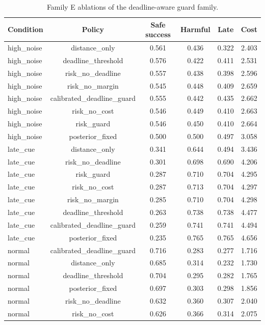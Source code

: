 \begin{table}[t]
\centering
\small
\caption{Family E ablations of the deadline-aware guard family.}
\label{tab:ablations}
\begin{tabular}{lccccc}
\toprule
Condition & Policy & Safe success & Harmful & Late & Cost \\
\midrule
high\_noise & distance\_only & 0.561 & 0.436 & 0.322 & 2.403 \\
high\_noise & deadline\_threshold & 0.576 & 0.422 & 0.411 & 2.531 \\
high\_noise & risk\_no\_deadline & 0.557 & 0.438 & 0.398 & 2.596 \\
high\_noise & risk\_no\_margin & 0.545 & 0.448 & 0.409 & 2.659 \\
high\_noise & calibrated\_deadline\_guard & 0.555 & 0.442 & 0.435 & 2.662 \\
high\_noise & risk\_no\_cost & 0.546 & 0.449 & 0.410 & 2.663 \\
high\_noise & risk\_guard & 0.546 & 0.450 & 0.410 & 2.664 \\
high\_noise & posterior\_fixed & 0.500 & 0.500 & 0.497 & 3.058 \\
late\_cue & distance\_only & 0.341 & 0.644 & 0.494 & 3.436 \\
late\_cue & risk\_no\_deadline & 0.301 & 0.698 & 0.690 & 4.206 \\
late\_cue & risk\_guard & 0.287 & 0.710 & 0.704 & 4.295 \\
late\_cue & risk\_no\_cost & 0.287 & 0.713 & 0.704 & 4.297 \\
late\_cue & risk\_no\_margin & 0.285 & 0.710 & 0.704 & 4.298 \\
late\_cue & deadline\_threshold & 0.263 & 0.738 & 0.738 & 4.477 \\
late\_cue & calibrated\_deadline\_guard & 0.259 & 0.741 & 0.741 & 4.494 \\
late\_cue & posterior\_fixed & 0.235 & 0.765 & 0.765 & 4.656 \\
normal & calibrated\_deadline\_guard & 0.716 & 0.283 & 0.277 & 1.716 \\
normal & distance\_only & 0.685 & 0.314 & 0.232 & 1.730 \\
normal & deadline\_threshold & 0.704 & 0.295 & 0.282 & 1.765 \\
normal & posterior\_fixed & 0.697 & 0.303 & 0.298 & 1.856 \\
normal & risk\_no\_deadline & 0.632 & 0.360 & 0.307 & 2.040 \\
normal & risk\_no\_cost & 0.626 & 0.366 & 0.314 & 2.075 \\

\end{tabular}
\end{table}
